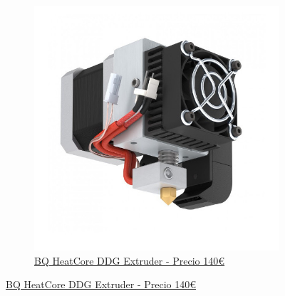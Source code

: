 \documentclass[11pt,a4paper]{article}
\begin{document}
\begin{figure}[H]
\begin{subfigure}[b]{0.4\textwidth}
        \includegraphics[width=\textwidth,cfbox=azul_marcos 4pt 0pt]{FOTOS/EXTRUSOR6}
		\caption*{\href{http://www.bq.es}{{\footnotesize BQ HeatCore DDG Extruder - Precio 140\euro}}}
    \end{subfigure}
\end{figure}
\end{document}

